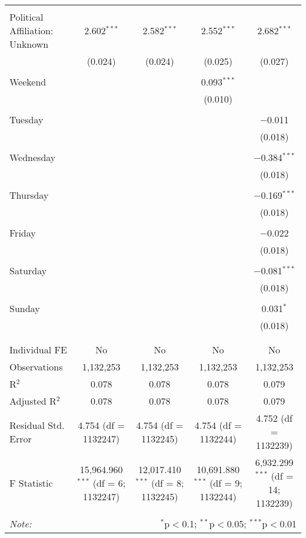 \documentclass[
]{article}
\begin{document}
\begin{table}[!htbp]
{\begin{tabular}{@{\extracolsep{5pt}}lcccc}
  & & & & \\ 
 Political Affiliation: Unknown & 2.602$^{***}$ & 2.582$^{***}$ & 2.552$^{***}$ & 2.682$^{***}$ \\ 
  & (0.024) & (0.024) & (0.025) & (0.027) \\ 
  & & & & \\ 
 Weekend &  &  & 0.093$^{***}$ &  \\ 
  &  &  & (0.010) &  \\ 
  & & & & \\ 
 Tuesday &  &  &  & $-$0.011 \\ 
  &  &  &  & (0.018) \\ 
  & & & & \\ 
 Wednesday &  &  &  & $-$0.384$^{***}$ \\ 
  &  &  &  & (0.018) \\ 
  & & & & \\ 
 Thursday &  &  &  & $-$0.169$^{***}$ \\ 
  &  &  &  & (0.018) \\ 
  & & & & \\ 
 Friday &  &  &  & $-$0.022 \\ 
  &  &  &  & (0.018) \\ 
  & & & & \\ 
 Saturday &  &  &  & $-$0.081$^{***}$ \\ 
  &  &  &  & (0.018) \\ 
  & & & & \\ 
 Sunday &  &  &  & 0.031$^{*}$ \\ 
  &  &  &  & (0.018) \\ 
  & & & & \\ 
\hline \\[-1.8ex] 
Individual FE & No & No & No & No \\ 
Observations & 1,132,253 & 1,132,253 & 1,132,253 & 1,132,253 \\ 
R$^{2}$ & 0.078 & 0.078 & 0.078 & 0.079 \\ 
Adjusted R$^{2}$ & 0.078 & 0.078 & 0.078 & 0.079 \\ 
Residual Std. Error & 4.754 (df = 1132247) & 4.754 (df = 1132245) & 4.754 (df = 1132244) & 4.752 (df = 1132239) \\ 
F Statistic & 15,964.960$^{***}$ (df = 6; 1132247) & 12,017.410$^{***}$ (df = 8; 1132245) & 10,691.880$^{***}$ (df = 9; 1132244) & 6,932.299$^{***}$ (df = 14; 1132239) \\ 
\hline 
\hline \\[-1.8ex] 
\textit{Note:}  & \multicolumn{4}{r}{$^{*}$p$<$0.1; $^{**}$p$<$0.05; $^{***}$p$<$0.01} \\ 
\end{tabular}
} 
\end{table} 
\newpage
\end{document}
